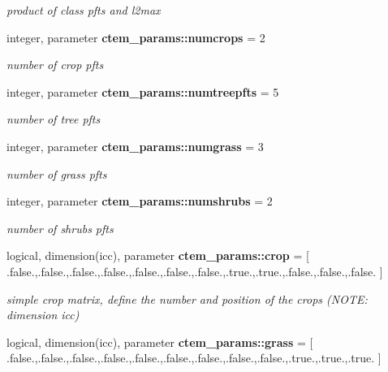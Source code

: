 \begin{DoxyCompactItemize}
\begin{DoxyCompactList}\small\item\em product of class pfts and l2max \end{DoxyCompactList}\item 
\hypertarget{namespacectem__params_a1da046f9e7bb1278e10a863dbfbda257}{}integer, parameter {\bfseries ctem\+\_\+params\+::numcrops} = 2\label{namespacectem__params_a1da046f9e7bb1278e10a863dbfbda257}

\begin{DoxyCompactList}\small\item\em number of crop pfts \end{DoxyCompactList}\item 
\hypertarget{namespacectem__params_a1bb0806116d93022aebdb7c5662a6375}{}integer, parameter {\bfseries ctem\+\_\+params\+::numtreepfts} = 5\label{namespacectem__params_a1bb0806116d93022aebdb7c5662a6375}

\begin{DoxyCompactList}\small\item\em number of tree pfts \end{DoxyCompactList}\item 
\hypertarget{namespacectem__params_aa48f481d72edc2d4d252c1fac748fabb}{}integer, parameter {\bfseries ctem\+\_\+params\+::numgrass} = 3\label{namespacectem__params_aa48f481d72edc2d4d252c1fac748fabb}

\begin{DoxyCompactList}\small\item\em number of grass pfts \end{DoxyCompactList}\item 
\hypertarget{namespacectem__params_a850eefc04333d2fa8736f5d43754b79f}{}integer, parameter {\bfseries ctem\+\_\+params\+::numshrubs} = 2\label{namespacectem__params_a850eefc04333d2fa8736f5d43754b79f}

\begin{DoxyCompactList}\small\item\em number of shrubs pfts \end{DoxyCompactList}\item 
\hypertarget{namespacectem__params_ae0f698eacc7fc8a7cfd68a15a90b4e8f}{}logical, dimension(icc), parameter {\bfseries ctem\+\_\+params\+::crop} = \mbox{[} .false.,.false.,.false.,.false.,.false.,.false.,.false.,.true.,.true.,.false.,.false.,.false. \mbox{]}\label{namespacectem__params_ae0f698eacc7fc8a7cfd68a15a90b4e8f}

\begin{DoxyCompactList}\small\item\em simple crop matrix, define the number and position of the crops (N\+O\+T\+E\+: dimension icc) \end{DoxyCompactList}\item 
\hypertarget{namespacectem__params_aa3cfb14989b4145f054926e8eea3382f}{}logical, dimension(icc), parameter {\bfseries ctem\+\_\+params\+::grass} = \mbox{[} .false.,.false.,.false.,.false.,.false.,.false.,.false.,.false.,.false.,.true.,.true.,.true. \mbox{]}\label{namespacectem__params_aa3cfb14989b4145f054926e8eea3382f}


\end{DoxyCompactItemize}
